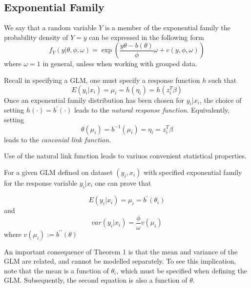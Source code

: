\newpage
\subsection{Exponential Family}

\begin{definition}
    We say that a random variable $Y$ is a member of the exponential family the probability density of $Y = y$ can be expressed in the following form
    $$f_Y(y|\theta, \phi, \omega) = \exp\left(\frac{y\theta - b(\theta)}{\phi}\omega + c(y,\phi, \omega)\right)$$
    where $\omega=1$ in general, unless when working with grouped data.
\end{definition}
\begin{definition}
    Recall in specifying a GLM, one must specify a response function $h$ such that 
    $$E(y_i | x_i) = \mu_i = h(\eta_i) = h(z_i^T\beta)$$
    Once an exponential family distribution has been chosen for $y_i | x_i$, the choice of setting $h(\cdot) = b^\prime(\cdot)$ leads to the \textit{natural response function}. Equivalently, setting 
    $$\theta(\mu_i) = b^{-1}(\mu_i) = \eta_i = z_i^T\beta$$ leads to the \textit{canconial link function}.
\end{definition}
\begin{note} Use of the natural link function leads to variuos convenient statistical properties.
    
\end{note}
\begin{theorem}
    For a given GLM defined on dataset $(y_i, x_i)$ with specified exponential family for the response variable $y_i | x_i$ one can prove that \begin{itemize}
        $$E(y_i | x_i) = \mu_i = b^{\prime}(\theta_i)$$
        and
        $$var(y_i | x_i) = \frac{\phi}{\omega}v(\mu_i)$$
        where $v(\mu_i) := b^{\prime\prime}(\theta)$
    \end{itemize}
\end{theorem}

\begin{remark}
    An important consequence of Theorem 1 is that the mean and variance of the GLM are related, and cannot be modelled separately. To see this implication, note that the mean is a function of $\theta_i$, which must be specified when defining the GLM. Subsequently, the second equation is also a function of $\theta$.
\end{remark}

